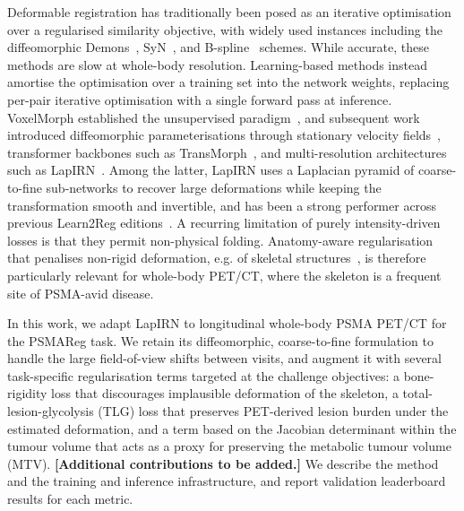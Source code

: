 Deformable registration has traditionally been posed as an iterative optimisation over a regularised similarity objective, with widely used instances including the diffeomorphic Demons~\cite{ref_demons}, SyN~\cite{ref_syn}, and B-spline~\cite{bspline} schemes.
While accurate, these methods are slow at whole-body resolution.
Learning-based methods instead amortise the optimisation over a training set into the network weights, replacing per-pair iterative optimisation with a single forward pass at inference.
VoxelMorph established the unsupervised paradigm~\cite{ref_voxelmorph_cvpr}, and subsequent work introduced diffeomorphic parameterisations through stationary velocity fields~\cite{ref_svf_voxelmorph}, transformer backbones such as TransMorph~\cite{ref_transmorph}, and multi-resolution architectures such as LapIRN~\cite{ref_lapirn}.
Among the latter, LapIRN uses a Laplacian pyramid of coarse-to-fine sub-networks to recover large deformations while keeping the transformation smooth and invertible, and has been a strong performer across previous Learn2Reg editions~\cite{ref_learn2reg_alessa,ref_learn2reg_hansen}.
A recurring limitation of purely intensity-driven losses is that they permit non-physical folding.
Anatomy-aware regularisation that penalises non-rigid deformation, e.g. of skeletal structures~\cite{ref_rigidity_1_loeckx,ref_rigidity_2_ruan,ref_rigidity_3_staring,ref_rigidity_4_staring_modersitzki}, is therefore particularly relevant for whole-body PET/CT, where the skeleton is a frequent site of PSMA-avid disease.

In this work, we adapt LapIRN to longitudinal whole-body PSMA PET/CT for the PSMAReg task.
We retain its diffeomorphic, coarse-to-fine formulation to handle the large field-of-view shifts between visits, and augment it with several task-specific regularisation terms targeted at the challenge objectives: a bone-rigidity loss that discourages implausible deformation of the skeleton, a total-lesion-glycolysis (TLG) loss that preserves PET-derived lesion burden under the estimated deformation, and a term based on the Jacobian determinant within the tumour volume that acts as a proxy for preserving the metabolic tumour volume (MTV).
\textbf{[Additional contributions to be added.]}
We describe the method and the training and inference infrastructure, and report validation leaderboard results for each metric.

